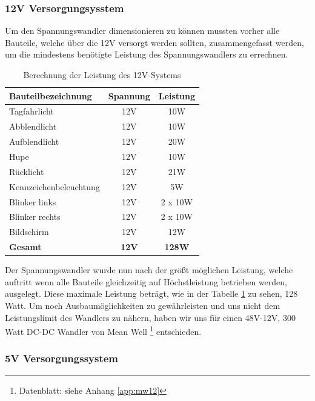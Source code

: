 \subsubsection{12V Versorgungsysstem}
Um den Spannungswandler dimensionieren zu können mussten vorher alle Bauteile, welche über die 12V versorgt werden sollten, zusammengefasst werden, um die mindestens benötigte Leistung des Spannungswandlers zu errechnen. 
\begin{table}[H]
\begin{center}
\begin{tabular}{|l|c|c|}
\hline
\textbf{Bauteilbezeichnung}     & \textbf{Spannung} & \textbf{Leistung} \\ \hline
Tagfahrlicht           & 12V      & 10W      \\ \hline
Abblendlicht           & 12V      & 10W      \\ \hline
Aufblendlicht          & 12V      & 20W      \\ \hline
Hupe                   & 12V      & 10W      \\ \hline
Rücklicht              & 12V      & 21W      \\ \hline
Kennzeichenbeleuchtung & 12V      & 5W       \\ \hline
Blinker links          & 12V      & 2 x 10W  \\ \hline
Blinker rechts         & 12V      & 2 x 10W  \\ \hline
Bildschirm             & 12V      & 12W      \\ \hline
\textbf{Gesamt}                 & \textbf{12V}      & \textbf{128W}     \\ \hline
\end{tabular}
\caption{Berechnung der Leistung des 12V-Systems}
\label{tab:leistung12V}
\end{center}
\end{table}

Der Spannungswandler wurde nun nach der größt möglichen Leistung, welche auftritt wenn alle Bauteile gleichzeitig auf Höchstleistung betrieben werden, ausgelegt. Diese maximale Leistung beträgt, wie in der Tabelle \ref{tab:leistung12V} zu sehen, 128 Watt. Um noch Ausbaumöglichkeiten zu gewährleisten und uns nicht dem Leistungslimit des Wandlers zu nähern, haben wir uns für einen 48V-12V, 300 Watt DC-DC Wandler von Mean Well \footnote{Datenblatt: siehe Anhang \ref{app:mw12}} entschieden. 

\subsubsection{5V Versorgungssystem}

